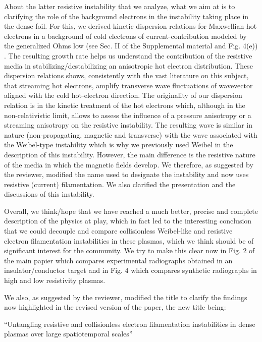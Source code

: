\documentclass{article}
\begin{document}
\begin{enumerate}
About the latter resistive instability that we analyze, what we aim at is to clarifying the role of the background electrons in the  instability taking place in the dense foil.
For this, 
we derived kinetic dispersion relations for Maxwellian hot electrons in a background of cold electrons of current-contribution modeled by the generalized Ohms low (see Sec. II of the Supplemental material and Fig. 4(e)) . 
The resulting growth rate helps us understand the contribution of the resistive media in stabilizing/destabilizing an anisotropic hot electron distribution. These dispersion relations shows, consistently with the vast literature on this subject,  that streaming hot electrons, amplify transverse wave fluctuations of wavevector aligned with the cold hot-electron direction. 
The originality of our dispersion relation is in the kinetic treatment of the hot electrons which, although in the non-relativistic limit, allows to assess the influence of a pressure anisotropy or a streaming anisotropy  on the resistive instability. 
The resulting wave is  similar in nature  (non-propagating, magnetic and transverse)  with the wave associated with the Weibel-type instability which is why we previously used Weibel in the description of this instability.  
However,  the main difference is the resistive nature of the media in which the magnetic fields  develop.  We therefore, as suggested by the reviewer, modified the name used to designate the instability and now uses resistive (current) filamentation. We also clarified the presentation and the discussions of this instability.

Overall, we think/hope that  we have reached a much better, precise and complete description of the physics at play, which in fact led to the interesting conclusion that we could decouple and compare collisionless Weibel-like and resistive electron filamentation instabilities in these plasmas, which we think should be of significant interest for the community.
We try to make this clear now in Fig. 2  of the main papier which compares experimental radiographs obtained in an  insulator/conductor target and in Fig. 4 which compares synthetic radiographs in high and low resistivity plasmas.

We also, as suggested by the reviewer, modified the title to clarify the findings now highlighted in the revised version of the paper, the new title being:

“Untangling resistive and collisionless electron filamentation instabilities in dense plasmas over large spatiotemporal scales”



\end{enumerate}
\end{document}
